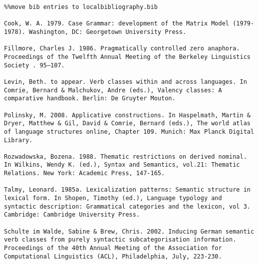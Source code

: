 \documentclass[output=paper]{langsci/langscibook}
\begin{document}
\begin{verbatim}%%move bib entries to localbibliography.bib

Cook, W. A. 1979. Case Grammar: development of the Matrix Model (1979-1978). Washington, DC: Georgetown University Press.
 
Fillmore, Charles J. 1986. Pragmatically controlled zero anaphora. Proceedings of the Twelfth Annual Meeting of the Berkeley Linguistics Society . 95–107.

Levin, Beth. to appear. Verb classes within and across languages. In Comrie, Bernard & Malchukov, Andre (eds.), Valency classes: A comparative handbook. Berlin: De Gruyter Mouton.

Polinsky, M. 2008. Applicative constructions. In Haspelmath, Martin & Dryer, Matthew & Gil, David & Comrie, Bernard (eds.), The world atlas of language structures online, Chapter 109. Munich: Max Planck Digital Library.

Rozwadowska, Bozena. 1988. Thematic restrictions on derived nominal. In Wilkins, Wendy K. (ed.), Syntax and Semantics, vol.21: Thematic Relations. New York: Academic Press, 147-165.

Talmy, Leonard. 1985a. Lexicalization patterns: Semantic structure in lexical form. In Shopen, Timothy (ed.), Language typology and syntactic description: Grammatical categories and the lexicon, vol 3. Cambridge: Cambridge University Press.

Schulte im Walde, Sabine & Brew, Chris. 2002. Inducing German semantic verb classes from purely syntactic subcategorisation information. Proceedings of the 40th Annual Meeting of the Association for Computational Linguistics (ACL), Philadelphia, July, 223-230.

\end{verbatim}

\printbibliography[heading=subbibliography,notkeyword=this]
\end{document}
